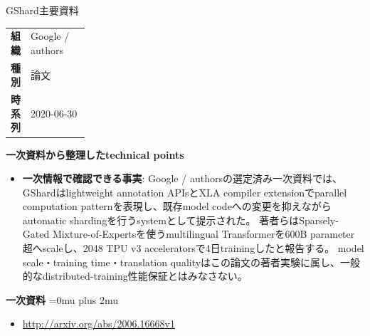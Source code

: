 \begin{technicalnote}{GShard}{主要資料}
\begingroup
\begin{tabularx}{\linewidth}{@{}>{\bfseries}p{0.22\linewidth}X@{}}
組織 & Google / authors \\
種別 & 論文 \\
時系列 & 2020-06-30 \\
\end{tabularx}
\smallskip
\begin{minipage}{\linewidth}
{\bfseries 一次資料から整理したtechnical points}
\begin{itemize}[leftmargin=1.5em,itemsep=0.35em]
\item \textbf{一次情報で確認できる事実}: Google / authorsの選定済み一次資料では、GShardはlightweight annotation APIsとXLA compiler extensionでparallel computation patternを表現し、既存model codeへの変更を抑えながらautomatic shardingを行うsystemとして提示された。 著者らはSparsely-Gated Mixture-of-Expertsを使うmultilingual Transformerを600B parameter超へscaleし、2048 TPU v3 acceleratorsで4日trainingしたと報告する。 model scale・training time・translation qualityはこの論文の著者実験に属し、一般的なdistributed-training性能保証とはみなさない。
\end{itemize}
\begin{samepage}
{\bfseries 一次資料}
\begingroup\sloppy
\Urlmuskip=0mu plus 2mu\relax
\begin{itemize}[leftmargin=1.5em,itemsep=0.25em]
\item {\scriptsize\url{http://arxiv.org/abs/2006.16668v1}}
\end{itemize}
\endgroup
\end{samepage}
\end{minipage}
\endgroup
\end{technicalnote}
\medskip
